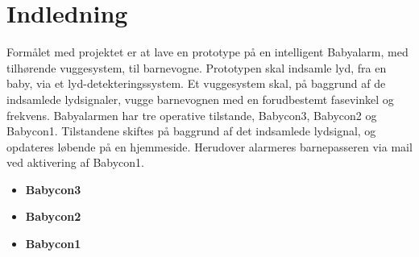 \section{Indledning}

Formålet med projektet er at lave en prototype på en intelligent Babyalarm, med tilhørende vuggesystem, til barnevogne. Prototypen skal indsamle lyd, fra en baby, via et lyd-detekteringssystem. Et vuggesystem skal, på baggrund af de indsamlede lydsignaler, vugge barnevognen med en forudbestemt fasevinkel og frekvens. Babyalarmen har tre operative tilstande, Babycon3, Babycon2 og Babycon1. Tilstandene skiftes på baggrund af det indsamlede lydsignal, og opdateres løbende på en hjemmeside. Herudover alarmeres barnepasseren via mail ved aktivering af Babycon1. 
\begin{itemize}
\item \textbf{Babycon3} 
\item \textbf{Babycon2}
\item \textbf{Babycon1}
\end{itemize}

